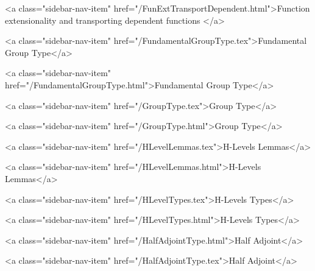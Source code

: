           <a class="sidebar-nav-item" href="/FunExtTransportDependent.html">Function extensionality and transporting dependent functions </a>
        
      
    
      
        
          <a class="sidebar-nav-item" href="/FundamentalGroupType.tex">Fundamental Group Type</a>
        
      
    
      
        
          <a class="sidebar-nav-item" href="/FundamentalGroupType.html">Fundamental Group Type</a>
        
      
    
      
        
          <a class="sidebar-nav-item" href="/GroupType.tex">Group Type</a>
        
      
    
      
        
          <a class="sidebar-nav-item" href="/GroupType.html">Group Type</a>
        
      
    
      
        
          <a class="sidebar-nav-item" href="/HLevelLemmas.tex">H-Levels Lemmas</a>
        
      
    
      
        
          <a class="sidebar-nav-item" href="/HLevelLemmas.html">H-Levels Lemmas</a>
        
      
    
      
        
          <a class="sidebar-nav-item" href="/HLevelTypes.tex">H-Levels Types</a>
        
      
    
      
        
          <a class="sidebar-nav-item" href="/HLevelTypes.html">H-Levels Types</a>
        
      
    
      
        
          <a class="sidebar-nav-item" href="/HalfAdjointType.html">Half Adjoint</a>
        
      
    
      
        
          <a class="sidebar-nav-item" href="/HalfAdjointType.tex">Half Adjoint</a>
        
